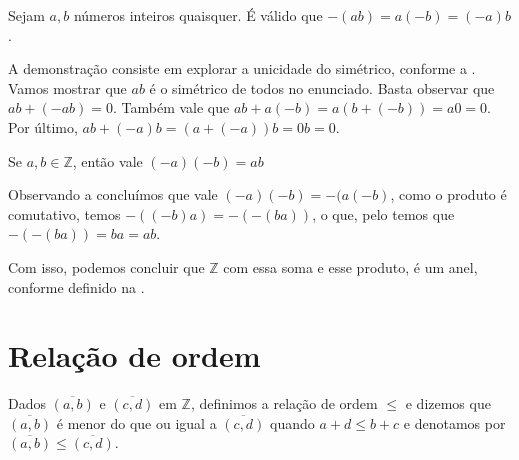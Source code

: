 \documentclass[../main.tex]{subfiles}
\begin{document}
\begin{prop}\label{int-prop-sinalRegra1}
    Sejam $a, b$ números inteiros quaisquer. É válido que $-(ab) = a(-b) = (-a)b$.
\end{prop}
\begin{dem}
    A demonstração consiste em explorar a unicidade do simétrico, conforme a .
    Vamos mostrar que $ab$ é o simétrico de todos no enunciado. Basta observar que $ab + (-ab) = 0$.
    Também vale que $ab + a(-b) = a(b+(-b)) = a0 = 0$. Por último, $ab + (-a)b = (a + (-a))b = 0b = 0$.
\end{dem}
\begin{corol}\label{int-corol-sinalRegra2}
    Se $a,b \in \mathbb{Z}$, então vale $(-a)(-b) = ab$
\end{corol}
\begin{dem}
    Observando a  concluímos que vale $(-a)(-b) = -(a(-b)$, como o produto é comutativo, temos $-((-b)a) = -(-(ba))$,
    o que, pelo  temos que $-(-(ba)) = ba = ab$.
\end{dem}

Com isso, podemos concluir que $\mathbb{Z}$ com essa soma e esse produto, é um anel, conforme definido na .

\section{Relação de ordem}
\begin{defi}
    Dados $\overline{(a,b)}$ e $\overline{(c,d)}$ em $\mathbb{Z}$, definimos a relação de ordem $\leq$ e dizemos que $\overline{(a,b)}$ é menor do que ou igual a $\overline{(c,d)}$ quando $a+d \leq b+c$ e denotamos por $\overline{(a,b)} \leq \overline{(c,d)}$.
\end{defi}
\end{document}

